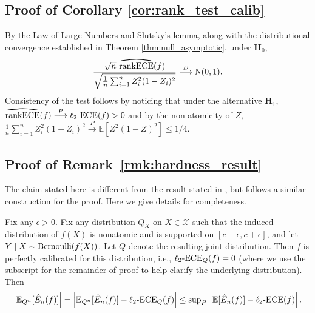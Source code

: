 \documentclass[11pt]{article}
\numberwithin{equation}{section}
\theoremstyle{definition}
\newcommand{\E}{\mathbb{E}}
\newcommand{\cX}{\mathcal{X}}
\newcommand{\pto}{\overset{P}{\longrightarrow}}
\newcommand{\dto}{\overset{D}{\longrightarrow}}
\newcommand{\myoverline}[2][3.5em]{%
  \overset{%
    \tikz[baseline=-0.1ex]{
      \draw[line width=0.75pt]
        (0,0) .. controls (#1/2,0.5ex) .. (#1,0);
    }%
  }{#2}%
}
\newcommand{\ECE}{\mathrm{ECE}}
\newcommand{\lECE}{\ell_2\textnormal{-}\ECE}
\newcommand{\rankECE}{\mathrm{rankECE}}
\newcommand{\hatrankECE}{\myoverline{\rankECE}}
\begin{document}
\subsection{Proof of Corollary \ref{cor:rank_test_calib}}\label{appendix:proofof_cor_rank_test}
By the Law of Large Numbers and Slutsky's lemma, along with the distributional convergence established in Theorem \ref{thm:null_asymptotic}, under $\bm H_0$,
\begin{align*}
\frac{\sqrt{n}\ \hatrankECE(f)}{\sqrt{\frac{1}{n}\sum_{i=1}^{n}Z_i^2(1-Z_i)^2}}\dto \mathrm{N}(0,1).
\end{align*}
Consistency of the test follows by noticing that under the alternative $\bm H_1$, $\hatrankECE(f)\pto \lECE(f)>0$ and by the non-atomicity of $Z$, $\frac{1}{n}\sum_{i=1}^{n}Z_i^2(1-Z_i)^2\pto \E[Z^2(1-Z)^2]\leq 1/4$.

\subsection{Proof of Remark~\ref{rmk:hardness_result}}\label{app:hardness_result}
The claim stated here is different from the result stated in \citet[Theorem 12.5]{angelopoulos2024theoretical}, but follows a similar construction for the proof. Here we give details for completeness. 

Fix any $\epsilon>0$. Fix any distribution $Q_X$ on $X\in\cX$ such that the induced distribution of $f(X)$ is nonatomic and is supported on $[c-\epsilon,c+\epsilon]$, and let $Y\mid X \sim\textnormal{Bernoulli}(f(X))$. Let $Q$ denote the resulting joint distribution. Then $f$ is perfectly calibrated for this distribution, i.e., $\lECE_Q(f)=0$ (where we use the subscript for the remainder of proof to help clarify the underlying distribution). 
Then
\begin{equation}\label{eqn:bound1_proof_rmk_hardness}\left|\E_{Q^n}[\hat{E}_n(f)] \right|  = \left|\E_{Q^n}[\hat{E}_n(f)] - \lECE_Q(f)\right| \leq {\textstyle\sup_P} \,\left| \E[\hat{E}_n(f)] - \lECE(f)\right|.\end{equation}
\end{document}
